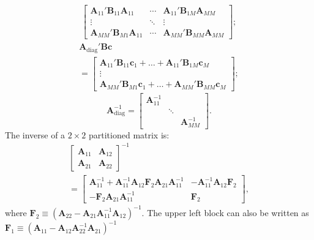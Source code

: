 \documentclass[8pt,letterpaper, landscape]{extarticle} %
\newcommand{\mA}{\ensuremath{\mathbf{A}}}
\newcommand{\mB}{\ensuremath{\mathbf{B}}}
\newcommand{\mc}{\ensuremath{\mathbf{c}}}
\begin{document}
\begin{multicols}{3}
\begin{description}
\begin{multline*}
\begin{bmatrix}
\mA_{11}' \mB_{11} \mA_{11} & \cdots & \mA_{11}' \mB_{1M} \mA_{MM} \\
\vdots & \ddots & \vdots \\
\mA_{MM}' \mB_{M1} \mA_{11} & \cdots & \mA_{MM}' \mB_{MM} \mA_{MM}
\end{bmatrix};
\end{multline*}
%
\begin{multline*}
\mA_{\text{diag}}' \mB \mc
\\ =
\begin{bmatrix}
\mA_{11}' \mB_{11} \mc_{1} + \dotsc + \mA_{11}' \mB_{1M} \mc_{M} \\
\vdots \\
\mA_{MM}' \mB_{M1} \mc_{1} + \dotsc + \mA_{MM}' \mB_{MM} \mc_{M}
\end{bmatrix};
\end{multline*}
%
$$ \mA_{\text{diag}}^{-1} = \begin{bmatrix}
\mA_{11}^{-1} &  &  \\
 & \ddots &  \\
 &  & \mA_{MM}^{-1}
\end{bmatrix}. $$
The inverse of a $ 2 \times 2 $ partitioned matrix is:
%
\begin{multline*}
\begin{bmatrix}
\mA_{11} & \mA_{12}  \\
\mA_{21} & \mA_{22}
\end{bmatrix}^{-1}
\\ =
\begin{bmatrix}
\mA_{11}^{-1} + \mA_{11}^{-1} \mA_{12} \mathbf{F}_2 \mA_{21} \mA_{11}^{-1} & -\mA_{11}^{-1} \mA_{12} \mathbf{F}_2  \\
- \mathbf{F}_2 \mA_{21} \mA_{11}^{-1} & \mathbf{F}_2
\end{bmatrix},
\end{multline*}
where $ \mathbf{F}_2 \equiv (\mA_{22} - \mA_{21} \mA_{11}^{-1} \mA_{12})^{-1} $. The upper left block can also be written as $ \mathbf{F}_1 \equiv (\mA_{11} - \mA_{12} \mA_{22}^{-1} \mA_{21})^{-1} $


\end{description}
\end{multicols}
\end{document}
